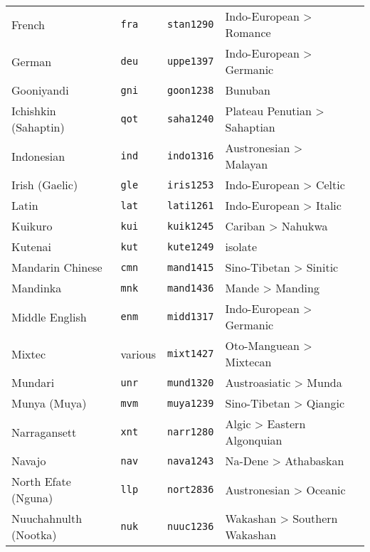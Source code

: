 \begin{longtable}[h]{ l l l l l }
  French                           & \texttt{fra}       & \texttt{stan1290}   & Indo-European > Romance\\
  German                           & \texttt{deu}       & \texttt{uppe1397}   & Indo-European > Germanic\\
  Gooniyandi                       & \texttt{gni}       & \texttt{goon1238}   & Bunuban\\
  Ichishkin (Sahaptin)             & \texttt{qot}       & \texttt{saha1240}   & Plateau Penutian > Sahaptian\\
  Indonesian                       & \texttt{ind}       & \texttt{indo1316}   & Austronesian > Malayan\\
  Irish (Gaelic)                   & \texttt{gle}       & \texttt{iris1253}   & Indo-European > Celtic\\
  Latin                            & \texttt{lat}       & \texttt{lati1261}   & Indo-European > Italic\\
  Kuikuro                          & \texttt{kui}       & \texttt{kuik1245}   & Cariban > Nahukwa\\
  Kutenai                          & \texttt{kut}       & \texttt{kute1249}   & isolate\\
  Mandarin Chinese                 & \texttt{cmn}       & \texttt{mand1415}   & Sino-Tibetan > Sinitic\\
  Mandinka                         & \texttt{mnk}       & \texttt{mand1436}   & Mande > Manding\\
  Middle English                   & \texttt{enm}       & \texttt{midd1317}   & Indo-European > Germanic\\
  Mixtec                           & various            & \texttt{mixt1427}   & Oto-Manguean > Mixtecan\\
  Mundari                          & \texttt{unr}       & \texttt{mund1320}   & Austroasiatic > Munda\\
  Munya (Muya)                     & \texttt{mvm}       & \texttt{muya1239}   & Sino-Tibetan > Qiangic\\
  Narragansett                     & \texttt{xnt}       & \texttt{narr1280}   & Algic > Eastern Algonquian\\
  Navajo                           & \texttt{nav}       & \texttt{nava1243}   & Na-Dene > Athabaskan\\
  North Efate (Nguna)              & \texttt{llp}       & \texttt{nort2836}   & Austronesian > Oceanic\\
  Nuuchahnulth (Nootka)            & \texttt{nuk}       & \texttt{nuuc1236}   & Wakashan > Southern Wakashan\\

\end{longtable}
